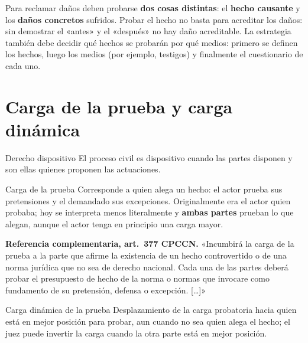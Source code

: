 \documentclass[12pt,oneside]{book}
\begin{document}
\begin{importante}
Para reclamar daños deben probarse \textbf{dos cosas distintas}: el \textbf{hecho causante} y los \textbf{daños concretos} sufridos. Probar el hecho no basta para acreditar los daños: sin demostrar el «antes» y el «después» no hay daño acreditable. La estrategia también debe decidir qué hechos se probarán por qué medios: primero se definen los hechos, luego los medios (por ejemplo, testigos) y finalmente el cuestionario de cada uno.
\end{importante}

\section{Carga de la prueba y carga dinámica}

\begin{definicion}{Derecho dispositivo}
El proceso civil es dispositivo cuando las partes disponen y son ellas quienes proponen las actuaciones.
\end{definicion}

\begin{definicion}{Carga de la prueba}
Corresponde a quien alega un hecho: el actor prueba sus pretensiones y el demandado sus excepciones. Originalmente era el actor quien probaba; hoy se interpreta menos literalmente y \textbf{ambas partes} prueban lo que alegan, aunque el actor tenga en principio una carga mayor.
\end{definicion}

\begin{nota}
\textbf{Referencia complementaria, art.~377 CPCCN.}
«Incumbirá la carga de la prueba a la parte que afirme la existencia de un hecho controvertido o de una norma jurídica que no sea de derecho nacional. Cada una de las partes deberá probar el presupuesto de hecho de la norma o normas que invocare como fundamento de su pretensión, defensa o excepción. [\ldots]»
\end{nota}

\begin{definicion}{Carga dinámica de la prueba}
Desplazamiento de la carga probatoria hacia quien está en mejor posición para probar, aun cuando no sea quien alega el hecho; el juez puede invertir la carga cuando la otra parte está en mejor posición.
\end{definicion}
\end{document}

